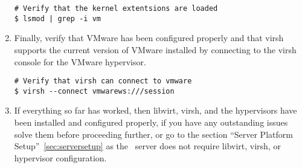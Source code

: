 \begin{enumerate}
\begin{lstlisting}
# Verify that the kernel extentsions are loaded
$ lsmod | grep -i vm
\end{lstlisting}

\item      Finally, verify that VMware has been configured properly and that virsh supports the current version of VMware 
                installed by connecting to the virsh console for the VMware hypervisor.

\lstset{language=bash,caption=Verify VMware Works with Virsh}
\begin{lstlisting}
# Verify that virsh can connect to vmware
$ virsh --connect vmwarews:///session
\end{lstlisting}

\item	If everything so far has worked, then libvirt, virsh, and the hypervisors have been installed and configured properly,
		if you have any outstanding issues solve them before proceeding further, or go to the section ``Server Platform 		
		Setup''~\ref{sec:serversetup} as the \tapper~server does not require libvirt, virsh, or hypervisor configuration.
		
\end{enumerate}




